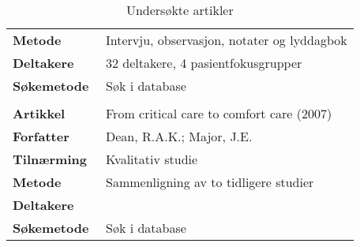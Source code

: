 \begin{table}
\begin{tabularx}{\textwidth}{lX}
    \textbf{Metode} & Intervju, observasjon, notater og lyddagbok \\
    \textbf{Deltakere} & 32 deltakere, 4 pasientfokusgrupper \\
    \textbf{Søkemetode} & Søk i database \\
    \\
    \textbf{Artikkel} & From critical care to comfort care (2007) \\
    \textbf{Forfatter} & Dean, R.A.K.; Major, J.E. \\
    \textbf{Tilnærming} & Kvalitativ studie \\
    \textbf{Metode} & Sammenligning av to tidligere studier \\
    \textbf{Deltakere} & \\
    \textbf{Søkemetode} & Søk i database \\
  \end{tabularx}
  \label{tabell.artikler}
  \caption{Undersøkte artikler}
\end{table}
